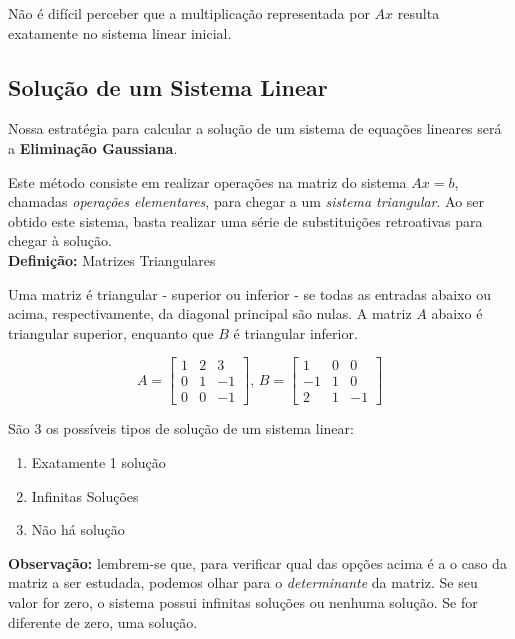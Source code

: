 \documentclass[12pt]{article}
\begin{document}
	Não é difícil perceber que a multiplicação representada por $Ax$ resulta exatamente no sistema linear inicial.
	
	\subsection{Solução de um Sistema Linear}
	
	Nossa estratégia para calcular a solução de um sistema de equações lineares será a \textbf{Eliminação Gaussiana}. 
	
	Este método consiste em realizar operações na matriz do sistema $Ax=b$, chamadas \textit{operações elementares}, para chegar a um \textit{sistema triangular}. Ao ser obtido este sistema, basta realizar uma série de substituições retroativas para chegar à solução.\\
	
	\textbf{Definição:} Matrizes Triangulares
	
	Uma matriz é triangular - superior ou inferior - se todas as entradas abaixo ou acima, respectivamente, da diagonal principal são nulas. A matriz $A$ abaixo é triangular superior, enquanto que $B$ é triangular inferior.
	
	\begin{equation*}
		A=
		\begin{bmatrix}
			1 & 2 & 3\\
			0 & 1 & -1\\
			0 & 0 & -1
		\end{bmatrix} \mbox{, } 
		B=
		\begin{bmatrix}
			1 & 0 &0\\
			-1 & 1 & 0\\
			2 & 1 & -1
		\end{bmatrix}
	\end{equation*}
	
	São 3 os possíveis tipos de solução de um sistema linear:
	\begin{enumerate}
		\item Exatamente 1 solução
		\item Infinitas Soluções
		\item Não há solução
	\end{enumerate}
	
	\textbf{Observação:} lembrem-se que, para verificar qual das opções acima é a o caso da matriz a ser estudada, podemos olhar para o \textit{determinante} da matriz. Se seu valor for zero, o sistema possui infinitas soluções ou nenhuma solução. Se for diferente de zero, uma solução.
	
\end{document}
